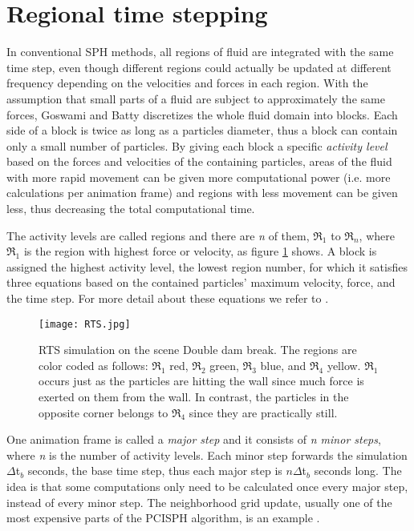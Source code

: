\documentclass[../../main.tex]{subfiles}
\begin{document}
\section{Regional time stepping}
In conventional SPH methods, all regions of fluid are integrated with the same time step, even though different regions could actually be updated at different frequency depending on the velocities and forces in each region. With the assumption that small parts of a fluid are subject to approximately the same forces, Goswami and Batty discretizes the whole fluid domain into blocks. Each side of a block is twice as long as a particles diameter, thus a block can contain only a small number of particles. By giving each block a specific \textit{activity level} based on the forces and velocities of the containing particles, areas of the fluid with more rapid movement can be given more computational power (i.e. more calculations per animation frame) and regions with less movement can be given less, thus decreasing the total computational time. 

The activity levels are called regions and there are \textit{n} of them, $\Re_1$ to $\Re_n$, where $\Re_1$ is the region with highest force or velocity, as figure \ref{fig:rts} shows. A block is assigned the highest activity level, the lowest region number, for which it satisfies three equations based on the contained particles' maximum velocity, force, and the time step. For more detail about these equations we refer to \citet{goswami2014regional}.

\begin{figure}[h!]
    \centering
    \texttt{[image: RTS.jpg]}
    \caption[RTS on Double dam break]{ RTS simulation on the scene Double dam break. The regions are color coded as follows: $\Re_1$ red, $\Re_2$ green, $\Re_3$ blue, and $\Re_4$ yellow. $\Re_1$ occurs just as the particles are hitting the wall since much force is exerted on them from the wall. In contrast, the particles in the opposite corner belongs to $\Re_4$ since they are practically still.  }
    \label{fig:rts}
\end{figure}

One animation frame is called a \textit{major step} and it consists of \textit{n minor steps}, where \textit{n} is the number of activity levels. Each minor step forwards the simulation $\Delta$t$_b$ seconds, the base time step, thus each major step is $n\Delta$t$_b$ seconds long. The idea is that some computations only need to be calculated once every major step, instead of every minor step. The neighborhood grid update, usually one of the most expensive parts of the PCISPH algorithm, is an example \citep{solenthaler2011two}. 
\end{document}
